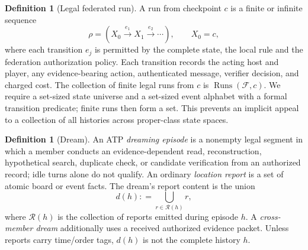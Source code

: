 \documentclass[11pt,letterpaper]{article}
\theoremstyle{definition}
\newtheorem{definition}[theorem]{Definition}
\theoremstyle{remark}
\newcommand{\Runs}{\operatorname{Runs}}
\newcommand{\defeq}{\mathrel{\mathop:}=}
\begin{document}
\begin{definition}[Legal federated run]
A run from checkpoint $c$ is a finite or infinite sequence
\[
\rho=(X_0\xrightarrow{e_1}X_1\xrightarrow{e_2}\cdots),\qquad X_0=c,
\]
where each transition $e_j$ is permitted by the complete state, the local rule and the federation authorization policy. Each transition records the acting host and player, any evidence-bearing action, authenticated message, verifier decision, and charged cost. The collection of finite legal runs from $c$ is $\Runs(\mathcal F,c)$. We require a set-sized state universe and a set-sized event alphabet with a formal transition predicate; finite runs then form a set. This prevents an implicit appeal to a collection of all histories across proper-class state spaces.
\end{definition}

\begin{definition}[Dream]
An ATP \emph{dreaming episode} is a nonempty legal segment in which a member conducts an evidence-dependent read, reconstruction, hypothetical search, duplicate check, or candidate verification from an authorized record; idle turns alone do not qualify. An ordinary \emph{location report} is a set of atomic board or event facts. The dream's report content is the union
\begin{equation}\label{eq:dream}
 d(h)\defeq\bigcup_{r\in\mathcal R(h)}r,
\end{equation}
where $\mathcal R(h)$ is the collection of reports emitted during episode $h$. A \emph{cross-member dream} additionally uses a received authorized evidence packet. Unless reports carry time/order tags, $d(h)$ is not the complete history $h$.
\end{definition}
\end{document}
